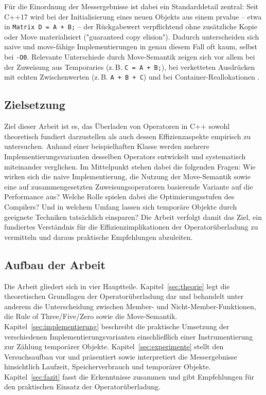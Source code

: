 \documentclass[10pt,a4paper]{article}
\begin{document}
Für die Einordnung der Messergebnisse ist dabei ein Standarddetail zentral:
Seit C++17 wird bei der Initialisierung eines neuen Objekts aus einem
prvalue -- etwa in \texttt{Matrix D = A + B;} -- der Rückgabewert
verpflichtend ohne zusätzliche Kopie oder Move materialisiert
("guaranteed copy elision"). Dadurch unterscheiden sich naive und
move-fähige Implementierungen in genau diesem Fall oft kaum, selbst bei
\texttt{-O0}. Relevante Unterschiede durch Move-Semantik zeigen sich vor
allem bei der Zuweisung aus Temporaries (z.\,B. \texttt{C = A + B;}), bei
verketteten Ausdrücken mit echten Zwischenwerten (z.\,B.
\texttt{A + B + C}) und bei Container-Reallokationen \cite{cppreference_elision,meyers2014}.

\subsection{Zielsetzung}

Ziel dieser Arbeit ist es, das Überladen von Operatoren in C++ sowohl
theoretisch fundiert darzustellen als auch dessen Effizienzaspekte empirisch
zu untersuchen. Anhand einer beispielhaften Klasse werden mehrere
Implementierungsvarianten desselben Operators entwickelt und systematisch
miteinander verglichen. Im Mittelpunkt stehen dabei die folgenden Fragen:
Wie wirken sich die naive Implementierung, die Nutzung der Move-Semantik
sowie eine auf zusammengesetzten Zuweisungsoperatoren basierende Variante auf
die Performance aus? Welche Rolle spielen dabei die Optimierungsstufen des
Compilers? Und in welchem Umfang lassen sich temporäre Objekte durch geeignete
Techniken tatsächlich einsparen? Die Arbeit verfolgt damit das Ziel, ein
fundiertes Verständnis für die Effizienzimplikationen der Operatorüberladung
zu vermitteln und daraus praktische Empfehlungen abzuleiten.

\subsection{Aufbau der Arbeit}

Die Arbeit gliedert sich in vier Hauptteile. Kapitel~\ref{sec:theorie} legt
die theoretischen Grundlagen der Operatorüberladung dar und behandelt unter
anderem die Unterscheidung zwischen Member- und Nicht-Member-Funktionen, die
Rule of Three/Five/Zero sowie die Move-Semantik. Kapitel~\ref{sec:implementierung}
beschreibt die praktische Umsetzung der verschiedenen Implementierungsvarianten
einschließlich einer Instrumentierung zur Zählung temporärer Objekte.
Kapitel~\ref{sec:experimente} stellt den Versuchsaufbau vor und präsentiert
sowie interpretiert die Messergebnisse hinsichtlich Laufzeit, Speicherverbrauch
und temporärer Objekte. Kapitel~\ref{sec:fazit} fasst die Erkenntnisse
zusammen und gibt Empfehlungen für den praktischen Einsatz der
Operatorüberladung.
\end{document}
